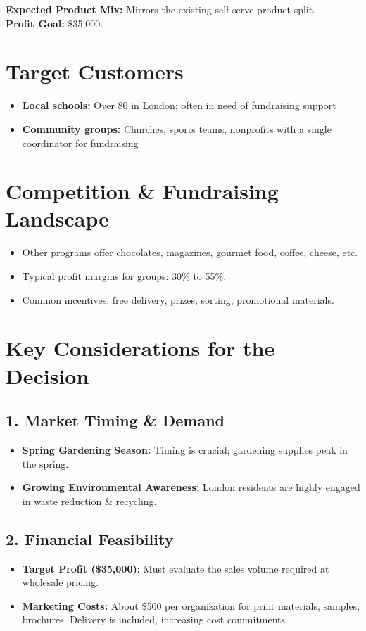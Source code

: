 \documentclass[12pt]{article}
\begin{document}
\noindent
\textbf{Expected Product Mix:} Mirrors the existing self-serve product split. \\
\textbf{Profit Goal:} \$35{,}000.

\section*{Target Customers}

\begin{itemize}
    \item \textbf{Local schools:} Over 80 in London; often in need of fundraising support
    \item \textbf{Community groups:} Churches, sports teams, nonprofits with a single coordinator for fundraising
\end{itemize}

\section*{Competition \& Fundraising Landscape}

\begin{itemize}
    \item Other programs offer chocolates, magazines, gourmet food, coffee, cheese, etc.
    \item Typical profit margins for groups: 30\% to 55\%.
    \item Common incentives: free delivery, prizes, sorting, promotional materials.
\end{itemize}

\section*{Key Considerations for the Decision}

\subsection*{1. Market Timing \& Demand}
\begin{itemize}
    \item \textbf{Spring Gardening Season:} Timing is crucial; gardening supplies peak in the spring.
    \item \textbf{Growing Environmental Awareness:} London residents are highly engaged in waste reduction \& recycling.
\end{itemize}

\subsection*{2. Financial Feasibility}
\begin{itemize}
    \item \textbf{Target Profit (\$35,000):} Must evaluate the sales volume required at wholesale pricing.
    \item \textbf{Marketing Costs:} About \$500 per organization for print materials, samples, brochures. Delivery is included, increasing cost commitments.
\end{itemize}
\end{document}
